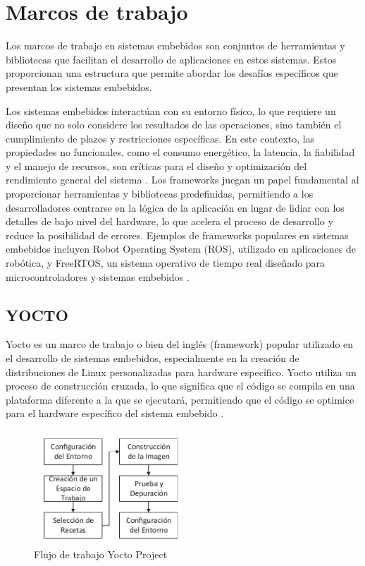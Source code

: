 \section{Marcos de trabajo}

Los marcos de trabajo en sistemas embebidos son conjuntos de herramientas y bibliotecas que facilitan el desarrollo de aplicaciones en estos 
sistemas. Estos proporcionan una estructura que permite abordar los desafíos específicos que presentan los sistemas embebidos.

Los sistemas embebidos interactúan con su entorno físico, lo que requiere un diseño que no solo considere los resultados de las operaciones, 
sino también el cumplimiento de plazos y restricciones específicas. En este contexto, las propiedades no funcionales, como el consumo energético, 
la latencia, la fiabilidad y el manejo de recursos, son críticas para el diseño y optimización del rendimiento general del sistema \cite{Marugn2017SimulacinYV}. Los frameworks 
juegan un papel fundamental al proporcionar herramientas y bibliotecas predefinidas, permitiendo a los desarrolladores centrarse en la lógica de la 
aplicación en lugar de lidiar con los detalles de bajo nivel del hardware, lo que acelera el proceso de desarrollo y reduce la posibilidad de errores. 
Ejemplos de frameworks populares en sistemas embebidos incluyen Robot Operating System (ROS), utilizado en aplicaciones de robótica, y FreeRTOS, 
un sistema operativo de tiempo real diseñado para microcontroladores y sistemas embebidos \cite{HerreraLpez2023EntornoDT}.

\subsection{YOCTO}\label{subsec:yocto}

Yocto es un marco de trabajo o bien del inglés (framework) popular utilizado en el desarrollo de sistemas embebidos, especialmente en la creación de distribuciones de Linux 
personalizadas para hardware específico. Yocto utiliza un proceso de construcción cruzada, lo que significa que el código se compila en una plataforma diferente 
a la que se ejecutará, permitiendo que el código se optimice para el hardware específico del sistema embebido \cite{Leppakoski2013FrameworkFI}.

\begin{figure}[h!]
    \centering
    \includegraphics[width=0.5\textwidth]{fig/teorico/Flujo de trabajo de yocto.pdf}
    \caption{Flujo de trabajo Yocto Project}
    \label{fig:yocto_project_workflow}
\end{figure}

